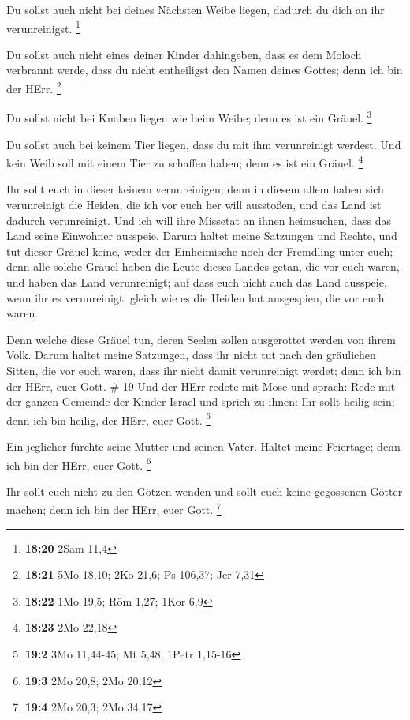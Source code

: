  Du sollst auch nicht bei deines Nächsten Weibe liegen,
dadurch du dich an ihr verunreinigst. \footnote{\textbf{18:20} 2Sam 11,4}

 Du sollst auch nicht eines deiner Kinder dahingeben, dass
es dem Moloch verbrannt werde, dass du nicht entheiligst den Namen
deines Gottes; denn ich bin der HErr. \footnote{\textbf{18:21} 5Mo
  18,10; 2Kö 21,6; Ps 106,37; Jer 7,31}

 Du sollst nicht bei Knaben liegen wie beim Weibe; denn es
ist ein Gräuel. \footnote{\textbf{18:22} 1Mo 19,5; Röm 1,27; 1Kor 6,9}

 Du sollst auch bei keinem Tier liegen, dass du mit ihm
verunreinigt werdest. Und kein Weib soll mit einem Tier zu schaffen
haben; denn es ist ein Gräuel. \footnote{\textbf{18:23} 2Mo 22,18}

 Ihr sollt euch in dieser keinem verunreinigen; denn in
diesem allem haben sich verunreinigt die Heiden, die ich vor euch her
will ausstoßen,  und das Land ist dadurch verunreinigt. Und
ich will ihre Missetat an ihnen heimsuchen, dass das Land seine
Einwohner ausspeie.  Darum haltet meine Satzungen und
Rechte, und tut dieser Gräuel keine, weder der Einheimische noch der
Fremdling unter euch;  denn alle solche Gräuel haben die
Leute dieses Landes getan, die vor euch waren, und haben das Land
verunreinigt;  auf dass euch nicht auch das Land ausspeie,
wenn ihr es verunreinigt, gleich wie es die Heiden hat ausgespien, die
vor euch waren.

 Denn welche diese Gräuel tun, deren Seelen sollen
ausgerottet werden von ihrem Volk.  Darum haltet meine
Satzungen, dass ihr nicht tut nach den gräulichen Sitten, die vor euch
waren, dass ihr nicht damit verunreinigt werdet; denn ich bin der HErr,
euer Gott. \# 19  Und der HErr redete mit Mose und sprach:
 Rede mit der ganzen Gemeinde der Kinder Israel und sprich
zu ihnen: Ihr sollt heilig sein; denn ich bin heilig, der HErr, euer
Gott. \footnote{\textbf{19:2} 3Mo 11,44-45; Mt 5,48; 1Petr 1,15-16}

 Ein jeglicher fürchte seine Mutter und seinen Vater. Haltet
meine Feiertage; denn ich bin der HErr, euer Gott. \footnote{\textbf{19:3}
  2Mo 20,8; 2Mo 20,12}

 Ihr sollt euch nicht zu den Götzen wenden und sollt euch
keine gegossenen Götter machen; denn ich bin der HErr, euer Gott.
\footnote{\textbf{19:4} 2Mo 20,3; 2Mo 34,17}

